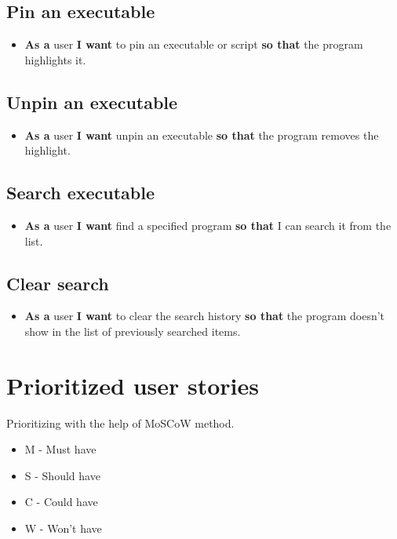\documentclass{article}
\begin{document}
\subsection{Pin an executable}
\begin{itemize}
    \item \textbf{As a} user \textbf{I want} to pin an executable or script \textbf{so that} the program highlights it.
\end{itemize}

\subsection{Unpin an executable}
\begin{itemize}
    \item \textbf{As a} user \textbf{I want} unpin an executable \textbf{so that} the program removes the highlight.
\end{itemize}

\subsection{Search executable}
\begin{itemize}
    \item \textbf{As a} user \textbf{I want} find a specified program \textbf{so that} I can search it from the list.
\end{itemize}

\subsection{Clear search}
\begin{itemize}
    \item \textbf{As a} user \textbf{I want} to clear the search history \textbf{so that} the program doesn't show in the list of previously searched items.
\end{itemize}

\section{Prioritized user stories}

Prioritizing with the help of MoSCoW method.
\begin{itemize}
    \item M - Must have
    \item S - Should have
    \item C - Could have
    \item W - Won't have
\end{itemize}
\end{document}
